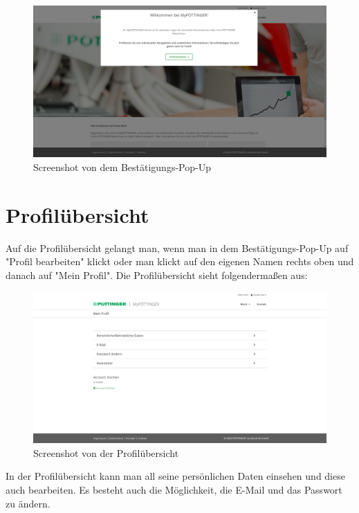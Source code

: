 \begin{figure}[H]
	\centerline{
		\includegraphics[width=1\textwidth]{./grafiken/erm_home_after_email.png}
	}
	\vskip0pt
	\caption{Screenshot von dem Bestätigungs-Pop-Up} \label{fig:popup}
\end{figure}

\section{Profilübersicht}

Auf die Profilübersicht gelangt man, wenn man in dem Bestätigungs-Pop-Up auf "Profil bearbeiten" klickt oder man klickt auf den eigenen Namen rechts oben und danach auf "Mein Profil". Die Profilübersicht sieht folgendermaßen aus:

\begin{figure}[H]
	\centerline{
		\includegraphics[width=1\textwidth]{./grafiken/erm_profil.png}
	}
	\vskip0pt
	\caption{Screenshot von der Profilübersicht} \label{fig:profil}
\end{figure}

In der Profilübersicht kann man all seine persönlichen Daten einsehen und diese auch bearbeiten. Es besteht auch die Möglichkeit, die E-Mail und das Passwort zu ändern.

